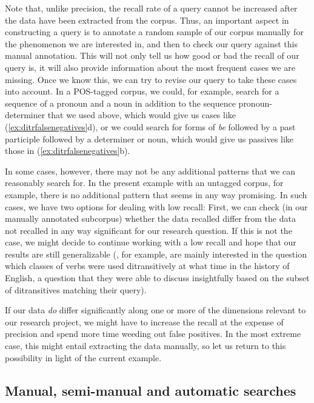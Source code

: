 Note that, unlike precision, the recall rate of a query cannot be increased after the data have been extracted from the corpus. Thus, an important aspect in constructing a query is to annotate a random sample of our corpus manually for the phenomenon we are interested in, and then to check our query against this manual annotation. This will not only tell us how good or bad the recall of our query is, it will also provide information about the most frequent cases we are missing. Once we know this, we can try to revise our query to take these cases into account. In a POS-tagged corpus, we could, for example, search for a sequence of a pronoun and a noun in addition to the sequence pronoun-determiner that we used above, which would give us cases like (\ref{ex:ditrfalsenegatives}d), or we could search for forms of \textit{be} followed by a past participle followed by a determiner or noun, which would give us passives like those in (\ref{ex:ditrfalsenegatives}b).

In some cases, however, there may not be any additional patterns that we can reasonably search for. In the present example with an untagged corpus, for example, there is no additional pattern that seems in any way promising. In such cases, we have two options for dealing with low recall: First, we can check (in our manually annotated subcorpus) whether the data recalled differ from the data not recalled in any way significant for our research question. If this is not the case, we might decide to continue working with a low recall and hope that our results are still generalizable (\citet{colleman_constructional_2011}, for example, are mainly interested in the question which classes of verbs were used ditransitively at what time in the history of English, a question that they were able to discuss insightfully based on the subset of ditransitives matching their query).

If our data \textit{do} differ significantly along one or more of the dimensions relevant to our research project, we might have to increase the recall at the expense of precision and spend more time weeding out false positives. In the most extreme case, this might entail extracting the data manually, so let us return to this possibility in light of the current example. 

\subsection{Manual, semi-manual and automatic searches}
\label{sec:searchtypes}

